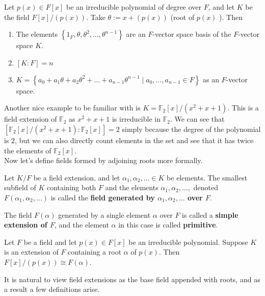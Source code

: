 \documentclass{memoir}
\begin{document}
\begin{thm}
	Let \(p(x) \in F[x]\) be an irreducible polynomial of degree over \(F\), and let \(K\) be the field \(F[x] / (p(x))\). Take \(\theta := x + (p(x))\) (root of \(p(x)\) ). Then
	\begin{enumerate}
		\item The elements \(\left\{ 1_F, \theta , \theta ^2, \ldots, \theta ^{n-1} \right\} \) are an \(F\)-vector space basis of the \(F\)-vector space \(K\).
		\item \([K:F] = n\) 
		\item \(K = \left\{a_0 + a_1\theta + a_2\theta^2 + \ldots + a_{n-1}\theta ^{n-1} \mid a_0,\ldots,a_{n-1} \in F \right\} \) as an \(F\)-vector space.
	\end{enumerate}
\end{thm}
Another nice example to be familiar with is \(K = \mathbb{F}_2[x] / (x^2+x+1)\). This is a field extension of \(\mathbb{F}_2\) as \(x^2+x+1\) is irreducible in \(\mathbb{F}_2\). We can see that \([\mathbb{F}_2[x] / (x^2+x+1) : \mathbb{F}_2[x]] = 2\) simply because the degree of the polynomial is \(2\), but we can also directly count elements in the set and see that it has twice the elements of \(\mathbb{F}_2[x]\).\\

Now let's define fields formed by adjoining roots more formally.

\begin{defn}
	Let \(K / F\) be a field extension, and let \(\alpha_1,\alpha_2,\ldots \in K\) be elements. The smallest subfield of \(K\) containing both \(F\) and the elements \(\alpha_1,\alpha_2,\ldots,\) denoted \(F(\alpha_1,\alpha_2,\ldots)\) is called the \textbf{field generated by \(\alpha_1, \alpha_2,\ldots\) over \(F\)}.
\end{defn}

\begin{defn}
	The field \(F(\alpha )\) generated by a single element \(\alpha \) over \(F\) is called a \textbf{simple extension of \(F\)}, and the element \(\alpha \) in this case is called \textbf{primitive}.
\end{defn}

\begin{thm}
	Let \(F\) be a field and let \(p(x) \in F[x]\) be an irreducible polynomial. Suppose \(K\) is an extension of \(F\) containing a root \(\alpha \) of \(p(x)\). Then \(F[x] / (p(x)) \cong F(\alpha )\).
\end{thm}
It is natural to view field extensions as the base field appended with roots, and as a result a few definitions arise.
\end{document}
